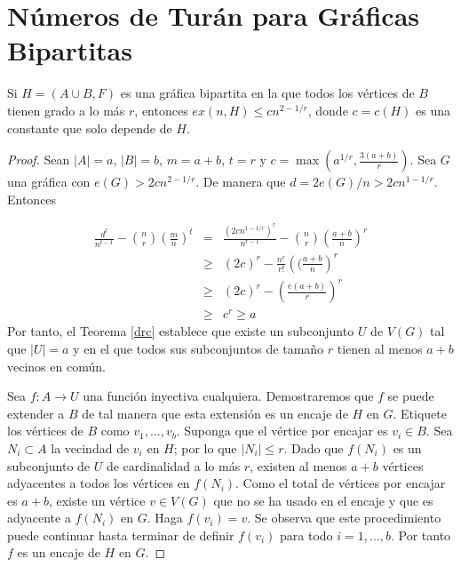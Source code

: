 
\section{Números de Turán para Gráficas Bipartitas}

\begin{theorem}\label{turan-drc}
  Si $H = (A \cup B, F)$ es una gráfica bipartita en la que todos los
  vértices de $B$ tienen grado
  a lo más $r$, entonces $ex(n, H) \leq c n^{2 - 1 / r}$, donde $c =
  c(H)$ es una constante que solo depende de $H$.
\end{theorem}
\begin{proof}
  Sean $\vert A \vert = a$, $\vert B
  \vert = b$, $m = a + b$, $t = r$
  y $c = \max(a^{1/r}, \frac{3(a + b)}{r})$. Sea $G$ una gráfica con
  $e(G) > 2 c n^{2 -1 /
  r}$. De manera que $d = 2e(G) / n > 2 c n^{1 - 1/r}$. Entonces

  \begin{eqnarray*}
    \frac{d^{t}}{n^{t-1}} - \binom{n}{r} \left(\frac{m}{n}\right)^t
    &=& \frac{(2c
    n^{1-1/r})^r}{n^{r-1}}  - \binom{n}{r} \left(\frac{a + b}{n}\right)^r\\
    &\geq& (2c)^r - \frac{n^r}{r!} \left((\frac{a + b}{n}\right)^r \\
      &\geq& (2c)^r - \left(\frac{e (a + b)}{r}\right)^r\\
      &\geq& c^r \geq a
    \end{eqnarray*}
    Por tanto, el Teorema \ref{drc} establece que existe un subconjunto
    $U$ de $V(G)$ tal que $\vert U \vert = a$ y en el que todos sus
    subconjuntos de tamaño
    $r$ tienen al menos $a + b$ vecinos en común.

    Sea $f: A \rightarrow U$ una función inyectiva cualquiera.
    Demostraremos que $f$ se puede extender a $B$ de tal manera que
    esta extensión es un encaje de $H$ en $G$. Etiquete los vértices de $B$ como
    $v_1, \ldots, v_b$. Suponga que el vértice por encajar es $v_i \in
    B$. Sea $N_i \subset A$ la vecindad de $v_i$ en $H$; por lo que
    $\vert N_i \vert \leq r$. Dado que $f(N_i)$ es un subconjunto de
    $U$ de cardinalidad a lo más $r$, existen al menos $a + b$ vértices
    adyacentes a todos los vértices en $f(N_i)$. Como el total de
    vértices por encajar es $a + b$, existe un vértice $v \in V(G)$ que
    no se ha usado en el encaje y que es adyacente a $f(N_i)$ en $G$.
    Haga $f(v_i)  = v$. Se observa que este procedimiento puede
    continuar hasta terminar de definir $f(v_i)$ para todo $i = 1,
    \ldots, b$. Por tanto $f$ es un encaje de  $H$ en $G$.
  \end{proof}

